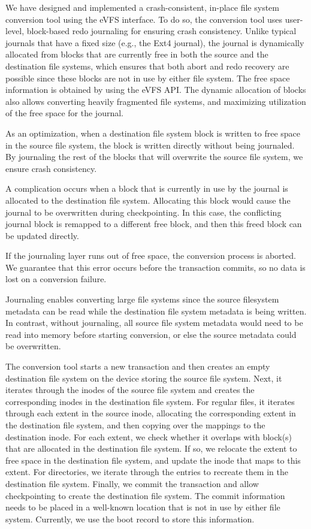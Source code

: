 We have designed and implemented a crash-consistent, in-place file system conversion tool using the eVFS interface. To do so, the conversion tool uses user-level, block-based redo journaling for ensuring crash consistency. Unlike typical journals that have a fixed size (e.g., the Ext4 journal), the journal is dynamically allocated from blocks that are currently free in both the source and the destination file systems, which ensures that both abort and redo recovery are possible since these blocks are not in use by either file system. The free space information is obtained by using the eVFS API. The dynamic allocation of blocks also allows converting heavily fragmented file systems, and maximizing utilization of the free space for the journal.

As an optimization, when a destination file system block is written to free space in the source file system, the block is written directly without being journaled. By journaling the rest of the blocks that will overwrite the source file system, we ensure crash consistency.

A complication occurs when a block that is currently in use by the journal is allocated to the destination file system. Allocating this block would cause the journal to be overwritten during checkpointing. In this case, the conflicting journal block is remapped to a different free block, and then this freed block can be updated directly.

If the journaling layer runs out of free space, the conversion process is aborted. We guarantee that this error occurs before the transaction commits, so no data is lost on a conversion failure.

Journaling enables converting large file systems since the source filesystem metadata can be read while the destination file system metadata is being written. In contrast, without journaling, all source file system metadata would need to be read into memory before starting conversion, or else the source metadata could be overwritten.

The conversion tool starts a new transaction and then creates an empty destination file system on the device storing the source file system. Next, it iterates through the inodes of the source file system and creates the corresponding inodes in the destination file system. For regular files, it iterates through each extent in the source inode, allocating the corresponding extent in the destination file system, and then copying over the mappings to the destination inode. For each extent, we check whether it overlaps with block(s) that are allocated in the destination file system. If so, we relocate the extent to free space in the destination file system, and update the inode that maps to this extent. For directories, we iterate through the entries to recreate them in the destination file system. Finally, we commit the transaction and allow checkpointing to create the destination file system. The commit information needs to be placed in a well-known location that is not in use by either file system. Currently, we use the boot record to store this information.

